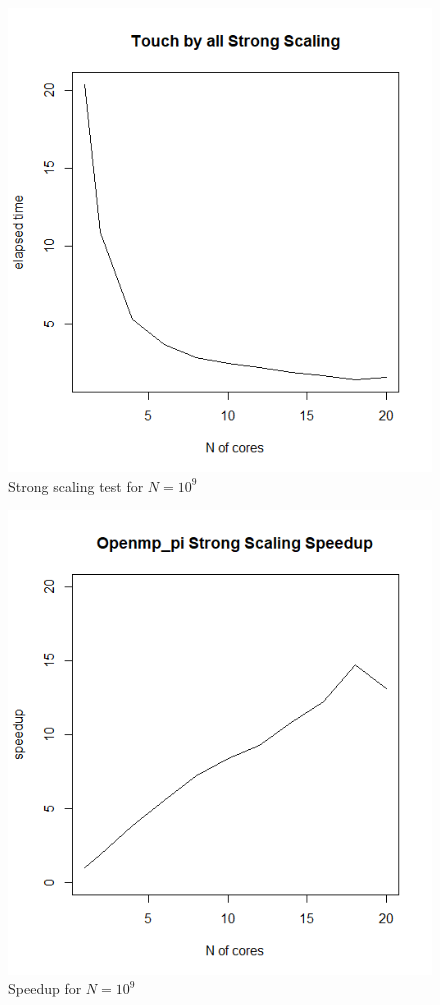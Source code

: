 \documentclass{article}
\begin{document}
\begin{figure}[H] %
	\centering
	\includegraphics[width=0.8\columnwidth]{graphs/openmp_pi_strongscaling} %
	\caption{Strong scaling test for $N=10^9$}
\end{figure}

\begin{figure}[H] %
	\centering
	\includegraphics[width=0.8\columnwidth]{graphs/openmp_pi_strongscaling_speedup} %
	\caption{Speedup for $N=10^9$}
\end{figure}
\end{document}
